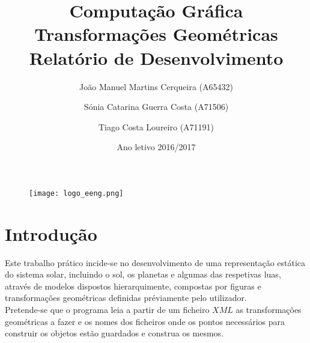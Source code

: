 \documentclass{report}
\begin{document}
\title{Computa\c{c}\~ao Gr\'afica \\ \setlength{\baselineskip}{1.5\baselineskip} \textbf{Transforma\c{c}\~oes Geom\'etricas} \\ Relat\'orio de Desenvolvimento}
\author{ Jo\~ao Manuel Martins Cerqueira (A65432) \and S\'onia Catarina Guerra Costa (A71506) \and Tiago Costa Loureiro (A71191)}
\date{Ano letivo 2016/2017}

\begin{figure}
\centering
\texttt{[image: logo\_eeng.png]}
\end{figure}



\maketitle 

\tableofcontents


\chapter{Introdu\c{c}\~{a}o}
 
Este trabalho pr\'atico incide-se no desenvolvimento de uma representa\c{c}\~ao est\'atica do sistema solar, incluindo o sol, os planetas e algumas das respetivas luas, atrav\'es de modelos dispostos hierarquimente, compostas por figuras e transforma\c{c}\~oes geom\'etricas definidas pr\'eviamente pelo utilizador. \\ Pretende-se que o programa leia a partir de um ficheiro $XML$ as transforma\c{c}\~oes geom\'etricas a fazer e os nomes dos ficheiros onde os pontos necess\'arios para construir os objetos est\~ao guardados e construa os mesmos. 
\end{document}
